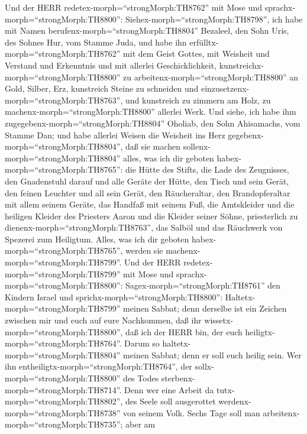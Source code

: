  Und der HERR redetex-morph=``strongMorph:TH8762'' mit Mose
und sprachx-morph=``strongMorph:TH8800'': 
Siehex-morph=``strongMorph:TH8798'', ich habe mit Namen
berufenx-morph=``strongMorph:TH8804'' Bezaleel, den Sohn Uris, des
Sohnes Hur, vom Stamme Juda,  und habe ihn
erfülltx-morph=``strongMorph:TH8762'' mit dem Geist Gottes, mit Weisheit
und Verstand und Erkenntnis und mit allerlei Geschicklichkeit,
 kunstreichx-morph=``strongMorph:TH8800'' zu
arbeitenx-morph=``strongMorph:TH8800'' an Gold, Silber, Erz,
 kunstreich Steine zu schneiden und
einzusetzenx-morph=``strongMorph:TH8763'', und kunstreich zu zimmern am
Holz, zu machenx-morph=``strongMorph:TH8800'' allerlei Werk.
 Und siehe, ich habe ihm
zugegebenx-morph=``strongMorph:TH8804'' Oholiab, den Sohn Ahisamachs,
vom Stamme Dan; und habe allerlei Weisen die Weisheit ins Herz
gegebenx-morph=``strongMorph:TH8804'', daß sie machen
sollenx-morph=``strongMorph:TH8804'' alles, was ich dir geboten
habex-morph=``strongMorph:TH8765'':  die Hütte des Stifts,
die Lade des Zeugnisses, den Gnadenstuhl darauf und alle Geräte der
Hütte,  den Tisch und sein Gerät, den feinen Leuchter und
all sein Gerät, den Räucheraltar,  den Brandopferaltar mit
allem seinem Geräte, das Handfaß mit seinem Fuß,  die
Amtskleider und die heiligen Kleider des Priesters Aaron und die Kleider
seiner Söhne, priesterlich zu dienenx-morph=``strongMorph:TH8763'',
 das Salböl und das Räuchwerk von Spezerei zum Heiligtum.
Alles, was ich dir geboten habex-morph=``strongMorph:TH8765'', werden
sie machenx-morph=``strongMorph:TH8799''.  Und der HERR
redetex-morph=``strongMorph:TH8799'' mit Mose und
sprachx-morph=``strongMorph:TH8800'': 
Sagex-morph=``strongMorph:TH8761'' den Kindern Israel und
sprichx-morph=``strongMorph:TH8800'':
Haltetx-morph=``strongMorph:TH8799'' meinen Sabbat; denn derselbe ist
ein Zeichen zwischen mir und euch auf eure Nachkommen, daß ihr
wissetx-morph=``strongMorph:TH8800'', daß ich der HERR bin, der euch
heiligtx-morph=``strongMorph:TH8764''.  Darum so
haltetx-morph=``strongMorph:TH8804'' meinen Sabbat; denn er soll euch
heilig sein. Wer ihn entheiligtx-morph=``strongMorph:TH8764'', der
sollx-morph=``strongMorph:TH8800'' des Todes
sterbenx-morph=``strongMorph:TH8714''. Denn wer eine Arbeit da
tutx-morph=``strongMorph:TH8802'', des Seele soll ausgerottet
werdenx-morph=``strongMorph:TH8738'' von seinem Volk. 
Sechs Tage soll man arbeitenx-morph=``strongMorph:TH8735''; aber am
